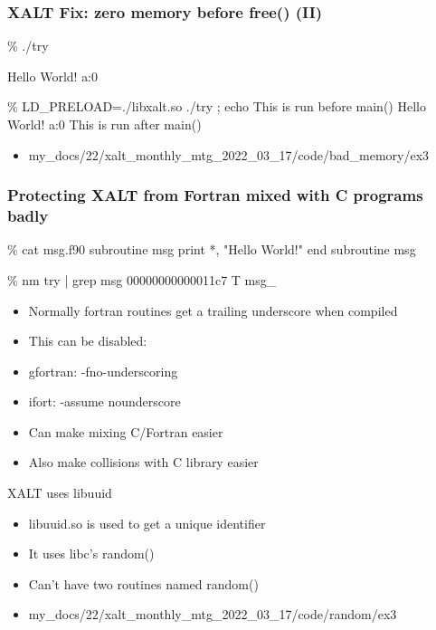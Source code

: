 \documentclass{beamer}
\begin{document}
\begin{frame}[fragile]
    \frametitle{XALT Fix: zero memory before free() (II)}
 {\small
   \begin{semiverbatim}
\% ./try

Hello World! {\color{blue} a:0}

\% LD_PRELOAD=./libxalt.so  ./try  ; echo
This is run before main()
Hello World! {\color{blue} a:0}
This is run after main()
    \end{semiverbatim}
}
  \begin{itemize}
    \item my\_docs/22/xalt\_monthly\_mtg\_2022\_03\_17/code/bad\_memory/ex3
  \end{itemize}
\end{frame}


\begin{frame}[fragile]
    \frametitle{Protecting XALT from Fortran mixed with C programs badly}
 {\tiny
    \begin{semiverbatim}
\% cat msg.f90
subroutine msg
   print *, "Hello World!"
end subroutine msg

\% nm try | grep msg
00000000000011c7 T msg_
    \end{semiverbatim}
}
  \begin{itemize}
    \item Normally fortran routines get a trailing underscore
      when compiled
    \item This can be disabled:
    \item gfortran: -fno-underscoring
    \item ifort:    -assume nounderscore
    \item Can make mixing C/Fortran easier
    \item Also make collisions with C library easier
  \end{itemize}
\end{frame}

\begin{frame}{XALT uses libuuid}
  \begin{itemize}
    \item libuuid.so is used to get a unique identifier
    \item It uses libc's random()
    \item Can't have two routines named random() 
    \item my\_docs/22/xalt\_monthly\_mtg\_2022\_03\_17/code/random/ex3


  \end{itemize}
\end{frame}
\end{document}
